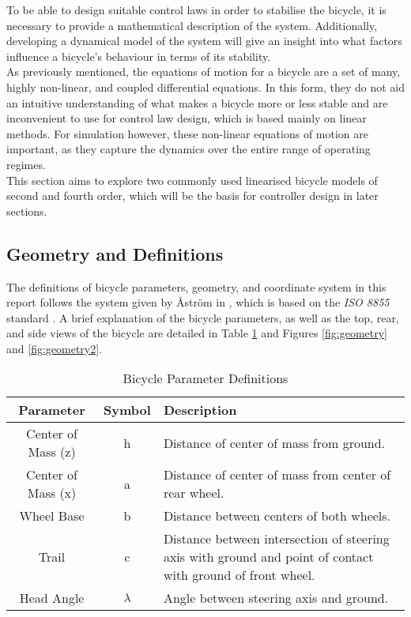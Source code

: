 To be able to design suitable control laws in order to stabilise the bicycle, it is necessary to provide a mathematical description of the system. Additionally, developing a dynamical model of the system will give an insight into what factors influence a bicycle's behaviour in terms of its stability. \\

As previously mentioned, the equations of motion for a bicycle are a set of many, highly non-linear, and coupled differential equations. In this form, they do not aid an intuitive understanding of what makes a bicycle more or less stable and are inconvenient to use for control law design, which is based mainly on linear methods. For simulation however, these non-linear equations of motion are important, as they capture the dynamics over the entire range of operating regimes. \\

This section aims to explore two commonly used linearised bicycle models of second and fourth order, which will be the basis for controller design in later sections.

\subsection{Geometry and Definitions}
The definitions of bicycle parameters, geometry, and coordinate system in this report follows the system given by {\AA}str{\"o}m in \cite{astrom}, which is based on the \textit{ISO 8855} standard \cite{iso}. A brief explanation of the bicycle parameters, as well as the top, rear, and side views of the bicycle are detailed in Table \ref{table:params} and Figures \ref{fig:geometry} and \ref{fig:geometry2}. \\

\begin{table}[H]
	\centering
 	\begin{tabular}[t]{c c p{10cm}} 
	\toprule
	Parameter & Symbol & Description \\
 	\midrule
 	Center of Mass (z) & h & Distance of center of mass from ground.\\ 
 	Center of Mass (x) & a & Distance of center of mass from center of rear wheel.\\
 	Wheel Base & b & Distance between centers of both wheels.\\
 	Trail & c & Distance between intersection of steering axis with ground and point of contact with ground of front wheel.\\
 	Head Angle & $\lambda$ & Angle between steering axis and ground.\\
 	\bottomrule
	\end{tabular}
 	\caption{Bicycle Parameter Definitions}
	\label{table:params}
\end{table}


